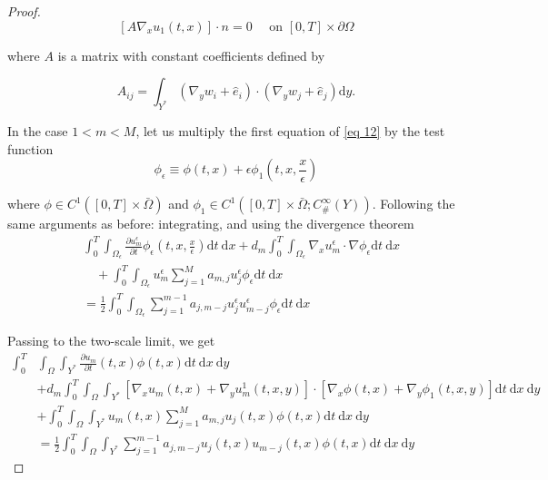 \begin{proof}
\begin{equation}
 \left[A \nabla_{x} u_{1}(t, x)\right] \cdot n=0 \quad \text { on }[0, T] \times \partial \Omega
\label{eq 97}\end{equation}


where $A$ is a matrix with constant coefficients defined by

$$
A_{i j}=\int_{Y^{*}}\left(\nabla_{y} w_{i}+\hat{e}_{i}\right) \cdot\left(\nabla_{y} w_{j}+\hat{e}_{j}\right) \mathrm{d} y .
$$

In the case $1<m<M$, let us multiply the first equation of \eqref{eq 12} by the test function
$$
\phi_{\epsilon} \equiv \phi(t, x)+\epsilon \phi_{1}\left(t, x, \frac{x}{\epsilon}\right)
$$

where $\phi \in C^{1}([0, T] \times \bar{\Omega})$ and $\phi_{1} \in C^{1}\left([0, T] \times \bar{\Omega} ; C_{\#}^{\infty}(Y)\right)$. Following the same arguments as before: integrating, and using the divergence theorem 
\begin{equation}
 \begin{aligned}
&\int_{0}^{T} \int_{\Omega_{\epsilon}} \frac{\partial u_{m}^{\epsilon}}{\partial t} \phi_{\epsilon}\left(t, x, \frac{x}{\epsilon}\right) \mathrm{d} t \mathrm{~d} x+d_{m} \int_{0}^{T} \int_{\Omega_{\epsilon}} \nabla_{x} u_{m}^{\epsilon} \cdot \nabla \phi_{\epsilon} \mathrm{d} t \mathrm{~d} x \\
&\quad+\int_{0}^{T} \int_{\Omega_{\epsilon}} u_{m}^{\epsilon} \sum_{j=1}^{M} a_{m, j} u_{j}^{\epsilon} \phi_{\epsilon} \mathrm{d} t \mathrm{~d} x \\
&=\frac{1}{2} \int_{0}^{T} \int_{\Omega_{\epsilon}} \sum_{j=1}^{m-1} a_{j, m-j} u_{j}^{\epsilon} u_{m-j}^{\epsilon} \phi_{\epsilon} \mathrm{d} t \mathrm{~d} x
\end{aligned}
\label{eq 98}\end{equation}


Passing to the two-scale limit, we get 
\begin{equation}
 \begin{aligned}
\int_{0}^{T} & \int_{\Omega} \int_{Y^{*}} \frac{\partial u_{m}}{\partial t}(t, x) \phi(t, x) \mathrm{d} t \mathrm{~d} x \mathrm{~d} y \\
&+d_{m} \int_{0}^{T} \int_{\Omega} \int_{Y^{*}}\left[\nabla_{x} u_{m}(t, x)+\nabla_{y} u_{m}^{1}(t, x, y)\right] \cdot\left[\nabla_{x} \phi(t, x)+\nabla_{y} \phi_{1}(t, x, y)\right] \mathrm{d} t \mathrm{~d} x \mathrm{~d} y \\
&+\int_{0}^{T} \int_{\Omega} \int_{Y^{*}} u_{m}(t, x) \sum_{j=1}^{M} a_{m, j} u_{j}(t, x) \phi(t, x) \mathrm{d} t \mathrm{~d} x \mathrm{~d} y \\
&=\frac{1}{2} \int_{0}^{T} \int_{\Omega} \int_{Y^{*}} \sum_{j=1}^{m-1} a_{j, m-j} u_{j}(t, x) u_{m-j}(t, x) \phi(t, x) \mathrm{d} t \mathrm{~d} x \mathrm{~d} y
\end{aligned}
\label{eq 99}\end{equation}



\end{proof}
